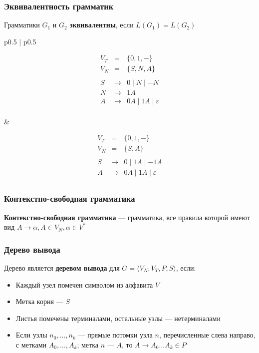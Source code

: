 \documentclass{beamer}
\begin{document}
\begin{frame}[fragile]
  \transwipe[direction=90]
  \frametitle{Эквивалентность грамматик}
\begin{center}
  Грамматики $G_1$ и $G_2$ \textbf{эквивалентны}, если $L(G_1) = L(G_2)$
\end{center}

\pause

\begin{tabular}{p{} | p{}}

\[
  \begin{array}{rcl}
  V_T &=& \{ 0, 1, - \} \\
  V_N &=& \{ S, N, A \} \\~\\
  S& \rightarrow & 0 \mid N \mid - N  \\
  N& \rightarrow & 1 A \\
  A& \rightarrow & 0 A \mid 1 A  \mid \varepsilon\\
  \end{array}
\]

&

\[
  \begin{array}{rcl}
  V_T &=& \{ 0, 1, - \} \\
  V_N &=& \{ S, A \} \\~\\
  S& \rightarrow & 0 \mid 1 A  \mid - 1 A  \\
  A& \rightarrow &  0 A \mid 1 A  \mid \varepsilon\\
  \end{array}
\]
\end{tabular}

\end{frame}

\begin{frame}[fragile]
  \transwipe[direction=90]
  \frametitle{Контекстно-свободная грамматика}
    \begin{center}
      \textbf{Контекстно-свободная грамматика} --- грамматика, все правила которой имеют вид $A \rightarrow \alpha, A \in V_N, \alpha \in V^*$
    \end{center}
\end{frame}

\begin{frame}[fragile]
  \transwipe[direction=90]
  \frametitle{Дерево вывода}

  Дерево является \textbf{деревом вывода} для $G = \langle V_N, V_T, P, S\rangle$, если:
  \begin{itemize}
    \item Каждый узел помечен символом из алфавита $V$
    \item Метка корня --- $S$
    \item Листья помечены терминалами, остальные узлы --- нетерминалами
    \item Если узлы $n_0, \dots, n_k$ --- прямые потомки узла $n$, перечисленные слева направо, с метками $A_0, \dots, A_k$; метка $n$ --- $A$, то $A \rightarrow A_0 \dots A_k \in P$
  \end{itemize}
\end{frame}
\end{document}
